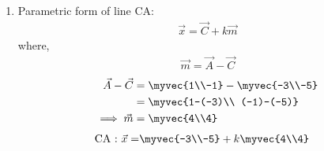 \documentclass[journal,12pt,twocolumn]{IEEEtran}
\begin{document}
\begin{enumerate}
\item Parametric form of line CA: 
\begin{align}
\vec{x} = \vec{C}+ k\vec{m}
\end{align}
where, \begin{align}
\vec{m} = \vec{A} - \vec{C}
\end{align}
\begin{align} 
\vec{ A } - \vec { C }&= \myvec{1\\-1}- \myvec{-3\\-5}\\
&= \myvec{1-(-3)\\ (-1)-(-5)}\\
\implies \vec {m} &= \myvec{4\\4}
\end{align}
\begin{align}
\text{CA : } \vec{x}=&\myvec{-3\\-5}+ k\myvec{4\\4}
\end{align}
\end{enumerate}
\end{document}
